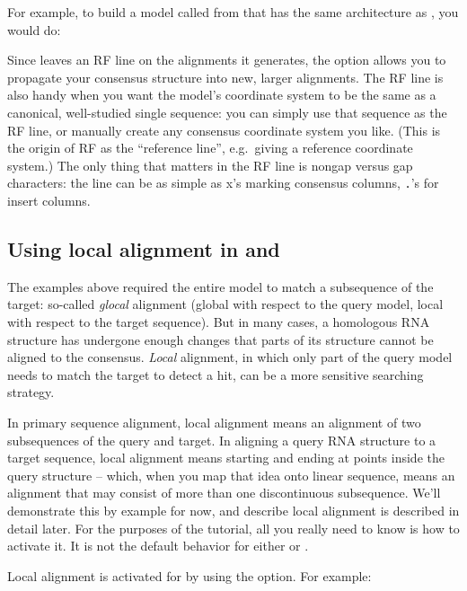 For example, to build a model called  from
 that has the same architecture as , you
would do:


Since  leaves an RF line on the alignments it generates,
the  option allows you to propagate your consensus
structure into new, larger alignments. The RF line is also handy when
you want the model's coordinate system to be the same as a canonical,
well-studied single sequence: you can simply use that sequence as the
RF line, or manually create any consensus coordinate system you like.
(This is the origin of RF as the ``reference line'', e.g.\ giving a
reference coordinate system.) The only thing that matters in the RF
line is nongap versus gap characters: the line can be as simple as x's
marking consensus columns, \verb+.+'s for insert columns.

\subsection{Using local alignment in  and }

The examples above required the entire model to match a subsequence of
the target: so-called \emph{glocal} alignment (global with respect to
the query model, local with respect to the target sequence). But in
many cases, a homologous RNA structure has undergone enough changes
that parts of its structure cannot be aligned to the
consensus. \emph{Local} alignment, in which only part of the query
model needs to match the target to detect a hit, can be a more
sensitive searching strategy.

In primary sequence alignment, local alignment means an alignment of
two subsequences of the query and target. In aligning a query RNA
structure to a target sequence, local alignment means starting and
ending at points inside the query structure -- which, when you map
that idea onto linear sequence, means an alignment that may consist of
more than one discontinuous subsequence. We'll demonstrate this by
example for now, and describe local alignment is described in detail
later.  For the purposes of the tutorial, all you really need to know
is how to activate it. It is not the default behavior for either
 or .

Local alignment is activated for  by using the
 option. For example:

